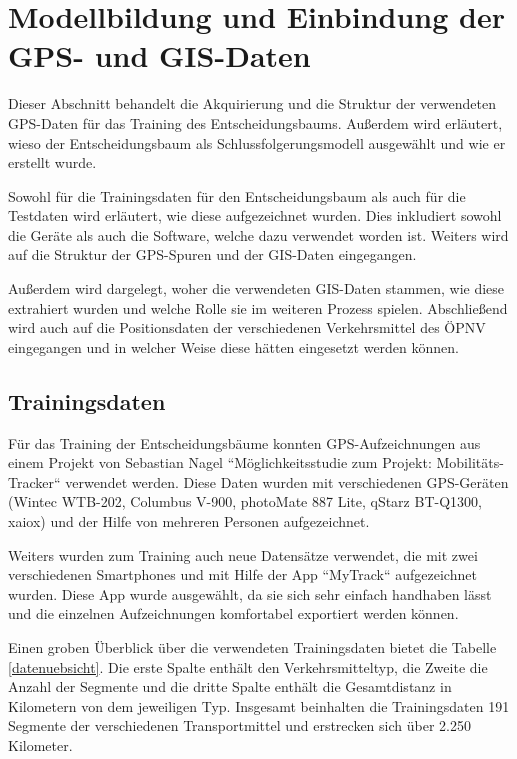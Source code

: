 \chapter{Modellbildung und Einbindung der GPS- und GIS-Daten}
Dieser Abschnitt behandelt die Akquirierung und die Struktur der verwendeten GPS-Daten für das Training des Entscheidungsbaums. Außerdem wird erläutert, wieso der Entscheidungsbaum als Schlussfolgerungsmodell ausgewählt und wie er erstellt wurde. 

Sowohl für die Trainingsdaten für den Entscheidungsbaum als auch für die Testdaten wird erläutert, wie diese aufgezeichnet wurden. Dies inkludiert sowohl die Geräte als auch die Software, welche dazu verwendet worden ist. Weiters wird auf die Struktur der GPS-Spuren und der GIS-Daten eingegangen.

Außerdem wird dargelegt, woher die verwendeten GIS-Daten stammen, wie diese extrahiert wurden und welche Rolle sie im weiteren Prozess spielen. Abschließend wird auch auf die Positionsdaten der verschiedenen Verkehrsmittel des ÖPNV eingegangen und in welcher Weise diese hätten eingesetzt werden können.
\clearpage

\section{Trainingsdaten}
\label{sec:trainingdata}
Für das Training der Entscheidungsbäume konnten GPS-Aufzeichnungen aus einem Projekt von Sebastian Nagel ``Möglichkeitsstudie zum Projekt: Mobilitäts-Tracker`` verwendet werden. Diese Daten wurden mit verschiedenen GPS-Geräten (Wintec WTB-202, Columbus V-900, photoMate 887 Lite, qStarz BT-Q1300, xaiox) und der Hilfe von mehreren Personen aufgezeichnet. \cite{sebastian_nagel_moglichkeitsstudie_2011}

Weiters wurden zum Training auch neue Datensätze verwendet, die mit zwei verschiedenen Smartphones und mit Hilfe der App ``MyTrack`` aufgezeichnet wurden. Diese App wurde ausgewählt, da sie sich sehr einfach handhaben lässt und die einzelnen Aufzeichnungen komfortabel exportiert werden können. 

Einen groben Überblick über die verwendeten Trainingsdaten bietet die Tabelle \ref{datenuebsicht}. Die erste Spalte enthält den Verkehrsmitteltyp, die Zweite die Anzahl der Segmente  und die dritte Spalte enthält die Gesamtdistanz in Kilometern von dem jeweiligen Typ. Insgesamt beinhalten die Trainingsdaten 191 Segmente der verschiedenen Transportmittel und erstrecken sich über 2.250 Kilometer.

